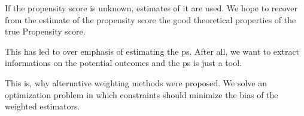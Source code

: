 If the propensity score is unknown, estimates of it are used.
We hope to recover from the estimate of the propensity score the good theoretical properties of the true Propensity score.

This has led to over emphasis of estimating the ps.
After all, we want to extract informations on the potential outcomes and the ps is just a tool.

This is, why alternative weighting methods were proposed.
We solve an optimization problem in which constraints should minimize the bias of the weighted estimators.



%
%
%
%
%
%
%
%
%
%
%
%
%
